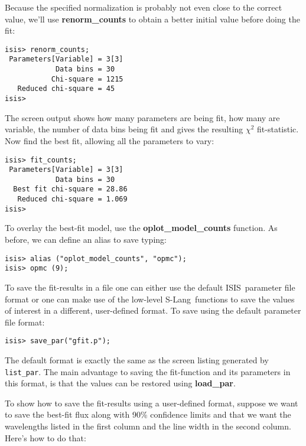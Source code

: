\documentclass{book}
\newcommand{\isisx}{{\sc ISIS~}}
\newcommand{\slang}{{\sc S-Lang}}
\begin{document}
Because the specified normalization is probably not even close to
the correct value, we'll use {\bf renorm\_counts} to obtain a better
initial value before doing the fit:
\begin{verbatim}
isis> renorm_counts;
 Parameters[Variable] = 3[3]
            Data bins = 30
           Chi-square = 1215
   Reduced chi-square = 45
isis>
\end{verbatim}
The screen output shows how many parameters are being fit, how
many are variable, the number of data bins being fit and gives the
resulting $\chi^2$ fit-statistic. Now find the best fit, allowing
all the parameters to vary:
\begin{verbatim}
isis> fit_counts;
 Parameters[Variable] = 3[3]
            Data bins = 30
  Best fit chi-square = 28.86
   Reduced chi-square = 1.069
isis>
\end{verbatim}
To overlay the best-fit model, use the {\bf oplot\_model\_counts} function.
As before, we can define an alias to save typing:
\begin{verbatim}
isis> alias ("oplot_model_counts", "opmc");
isis> opmc (9);
\end{verbatim}

To save the fit-results in a file one can either use the default
\isisx parameter file format or one can make use of the low-level
\slang\ functions to save the values of interest in a different,
user-defined format.  To save using the default parameter file
format:
\begin{verbatim}
isis> save_par("gfit.p");
\end{verbatim}
The default format is exactly the same as the screen listing
generated by {\tt list\_par}.  The main advantage to saving the
fit-function and its parameters in this format, is that the values
can be restored using {\bf load\_par}.

To show how to save the fit-results using a user-defined format,
suppose we want to save the best-fit flux along with 90\%
confidence limits and that we want the wavelengths listed in the
first column and the line width in the second column.  Here's how
to do that:
\end{document}
